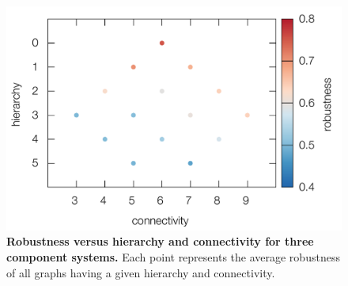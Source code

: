 \pagebreak

\begin{figure}[!ht]
\centering
\noindent\includegraphics[width=0.8\columnwidth]{fig/connectdist3D3x3.pdf}
\caption{{\bf Robustness versus hierarchy and connectivity for three component systems.} Each point represents the average robustness of all graphs having a given hierarchy and connectivity.}
\label{fig:connectdist3D3x3}
\end{figure}

